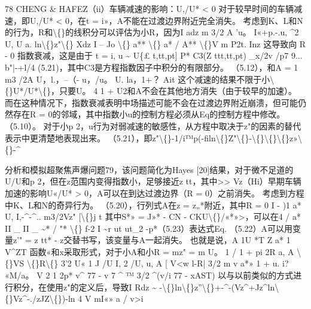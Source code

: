 \documentclass[UTF8,11pt,a4paper,openany,fontset=fandol]{ctexbook}
\begin{document}
78 CHENG \& HAFEZ（ii）车辆减速的影响：U,/U* < 0 对于较早时间的车辆减速，即U,/U* < 0，在t = i»，A不能在过渡边界附近完全消失。 考虑到K、L和N的行为，R和\textbackslash\{\}的线积分可以评估为小R，因为I adz m 3/2 A 'u。 I«+p.-.u, \textasciicircum{}2 U, U a. ln\textbackslash\{\}z"\textbackslash\{\} Xdz I -- Jo \textbackslash\{\} a** \textbackslash\{\} a* / A** \textbackslash\{\}V m P2t. Inz 这导致向 R - 0 指数衰减，这是由于 t = i, u \textasciitilde{} U\{£ t,tt,pt] P* C3(Z ttt,tt,pt) \_x/2v /p7 9... b"|-+l/4 (5.21)，其中C3是方程指数因子中积分的有限部分。 （5.12），和A = 1 m3 /2A U，l.，--（- u，/u。 U. la，1+？ Ait 这个减速的结果不限于小\textbackslash\{\}U*/U*\textbackslash\{\}，只要U。 4 1 + U2和A不会在其他地方消失（由于较早的加速）。 而在这种情况下，指数衰减表明中场描述可能不会在过渡边界附近崩溃，但可能仍然存在R = 0的邻域，其中指数小u的控制方程必须从Eq的控制方程中修改。 （5.10）。 对于小p 2，u行为对弱减速的敏感性，从方程中取决于z"的因素的替代表示中更清楚地表现出来。 （5.21），即z"\textbackslash\{\}-1/i™p(-filn\textbackslash\{\}Z"\textbackslash\{\}-\textbackslash\{\}\textbackslash\{\}\textbackslash\{\}z»\textbackslash\{\}-\textasciicircum{}

分析和模拟超聚焦声爆问题79，该问题简化为Hayes [20]结果，对于微不足道的U/U和p 2，但在z范围内变得指数小，足够接近z tt，其中>> Vz（Hi）早期车辆加速的影响U«/U* > 0，A可以在到达过渡边界（R = 0）之前消失。 考虑到方程中K、L和N的奇异行为。 （5.20），行列式A在z = z„*附近，其中R = 0 I - )1 a* U, I,-\textasciicircum{}-\textasciicircum{}.. m3/2Vz" [\textbackslash\{\}j t 其中S*» = J»* - CN - CKU\textbackslash\{\}/«*»>，可以在4 / a* II \_ II \_ \textasciitilde{}* / "* \textbackslash\{\} f-2 I \textasciitilde{}r ut ut\_2 -p*（5.23）表达式Eq. （5.22）A可以用变量z'" = z tt* - z交替书写，该变量与A一起消失。 也就是说，A 1U *T Z a* 1 V\textasciicircum{}ZT 函数«和x采取形式，对于小A和小R = mz" = m U。 1 / 1 + pi 2R a, A \textbackslash\{\}VS \textbackslash\{\}R\textbackslash\{\} 3'2 U« 1 J /U I, 2 /U, u, A [ V<w l-R| 3/2 m v a*» 1 + u. i? «M/a。 V 2 1 2p* v\textasciicircum{} 77 - v 7 \textasciicircum{} ™ 3/2 \textasciicircum{}(v/i 77 - xAST) 以与以前类似的方式进行积分，在使用z"的定义后，导致I Rdz \textasciitilde{} -\textbackslash\{\}ln\textbackslash\{\}z''\textbackslash\{\}+-\textasciicircum{}-(Vz\textasciicircum{}+Jz\textasciicircum{}ln\textbackslash\{\}Vz\textasciicircum{}-./zJZ\textbackslash\{\})-ln 4 V mI«» a / v>i
\end{document}

